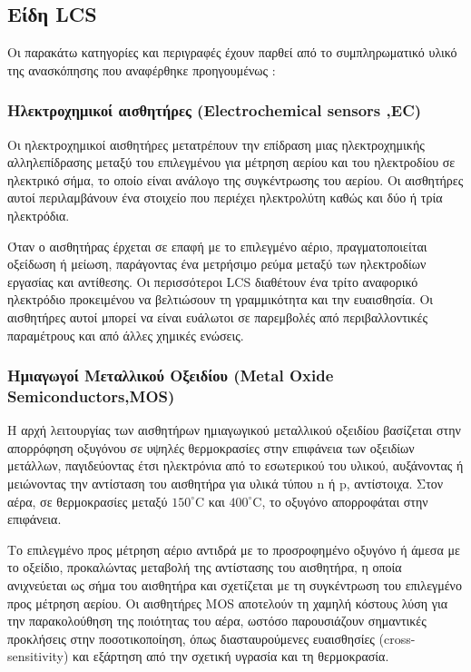 \subsection{Είδη LCS}

Οι παρακάτω κατηγορίες και περιγραφές έχουν παρθεί από το συμπληρωματικό υλικό της ανασκόπησης που αναφέρθηκε προηγουμένως \cite{Garcia2022}:
\subsubsection{Ηλεκτροχημικοί αισθητήρες (Electrochemical sensors ,EC)}

Οι ηλεκτροχημικοί αισθητήρες μετατρέπουν την επίδραση μιας ηλεκτροχημικής αλληλεπίδρασης μεταξύ του επιλεγμένου για μέτρηση  
αερίου και του ηλεκτροδίου σε ηλεκτρικό σήμα, το οποίο είναι ανάλογο της συγκέντρωσης του αερίου. 
Οι αισθητήρες αυτοί περιλαμβάνουν ένα στοιχείο που περιέχει ηλεκτρολύτη καθώς και δύο ή τρία ηλεκτρόδια. 

Όταν ο αισθητήρας έρχεται σε επαφή με το επιλεγμένο αέριο, 
πραγματοποιείται οξείδωση ή μείωση, παράγοντας ένα μετρήσιμο ρεύμα μεταξύ των ηλεκτροδίων εργασίας και αντίθεσης. 
Οι περισσότεροι LCS διαθέτουν ένα τρίτο αναφορικό ηλεκτρόδιο προκειμένου να βελτιώσουν τη γραμμικότητα και την ευαισθησία. 
Οι αισθητήρες αυτοί μπορεί να είναι ευάλωτοι σε παρεμβολές από περιβαλλοντικές παραμέτρους και από άλλες χημικές ενώσεις.


\subsubsection{Ημιαγωγοί Μεταλλικού Οξειδίου (Metal Oxide Semiconductors,MOS)}

Η αρχή λειτουργίας των αισθητήρων ημιαγωγικού μεταλλικού οξειδίου 
βασίζεται στην απορρόφηση οξυγόνου σε υψηλές θερμοκρασίες στην επιφάνεια των οξειδίων μετάλλων,
παγιδεύοντας έτσι ηλεκτρόνια από το εσωτερικού του υλικού, αυξάνοντας ή μειώνοντας την αντίσταση του αισθητήρα για υλικά τύπου n ή p, αντίστοιχα. 
Στον αέρα, σε θερμοκρασίες μεταξύ $150^\circ \mathrm{C}$ και $400^\circ \mathrm{C}$, το οξυγόνο απορροφάται στην επιφάνεια.

Το επιλεγμένο προς μέτρηση αέριο  αντιδρά με το προσροφημένο οξυγόνο ή άμεσα με το οξείδιο, 
προκαλώντας μεταβολή της αντίστασης του αισθητήρα, η οποία ανιχνεύεται ως σήμα του αισθητήρα και σχετίζεται με τη συγκέντρωση του  επιλεγμένο προς μέτρηση αερίου.
Οι αισθητήρες MOS αποτελούν τη χαμηλή κόστους λύση για την παρακολούθηση της ποιότητας του αέρα,
ωστόσο παρουσιάζουν σημαντικές προκλήσεις στην ποσοτικοποίηση, όπως διασταυρούμενες ευαισθησίες (cross-sensitivity) και εξάρτηση από την σχετική υγρασία και τη θερμοκρασία.

